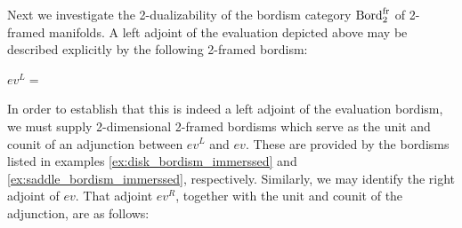 \documentclass{amsart}
\begin{document}
Next we investigate the 2-dualizability of the bordism category $\mathrm{Bord}^\mathrm{fr}_2$ of 2-framed manifolds.  A left adjoint of the evaluation depicted above may be described explicitly by the following 2-framed bordism:
\begin{center}
	$ev^L = $ 
\end{center}
In order to establish that this is indeed a left adjoint of the evaluation bordism, we must supply 2-dimensional 2-framed bordisms which serve as the unit and counit of an adjunction between $ev^L$ and $ev$. These are provided by the bordisms  listed in examples \ref{ex:disk_bordism_immerssed} and \ref{ex:saddle_bordism_immerssed}, respectively. 
Similarly, we may identify the right adjoint of $ev$.  That adjoint $ev^R$, together with the unit and counit of the adjunction, are as follows:
\end{document}
